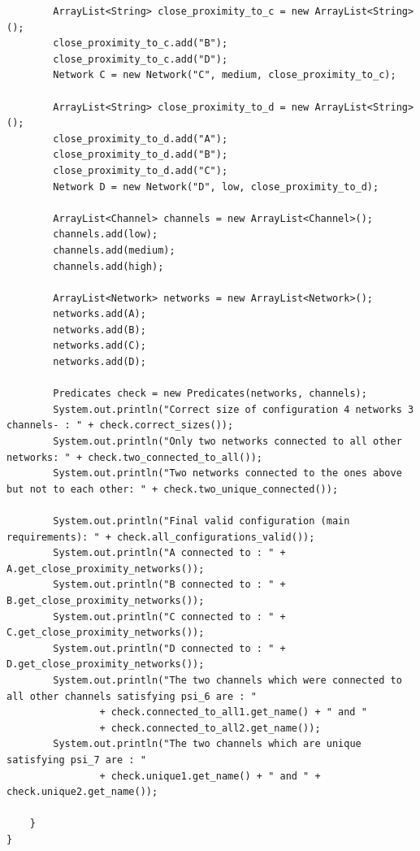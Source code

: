 \documentclass{article}
\begin{document}
\begin{enumerate}[(a)]
\begin{lstlisting}
        ArrayList<String> close_proximity_to_c = new ArrayList<String>();
        close_proximity_to_c.add("B");
        close_proximity_to_c.add("D");
        Network C = new Network("C", medium, close_proximity_to_c);

        ArrayList<String> close_proximity_to_d = new ArrayList<String>();
        close_proximity_to_d.add("A");
        close_proximity_to_d.add("B");
        close_proximity_to_d.add("C");
        Network D = new Network("D", low, close_proximity_to_d);

        ArrayList<Channel> channels = new ArrayList<Channel>();
        channels.add(low);
        channels.add(medium);
        channels.add(high);

        ArrayList<Network> networks = new ArrayList<Network>();
        networks.add(A);
        networks.add(B);
        networks.add(C);
        networks.add(D);

        Predicates check = new Predicates(networks, channels);
        System.out.println("Correct size of configuration 4 networks 3 channels- : " + check.correct_sizes());
        System.out.println("Only two networks connected to all other networks: " + check.two_connected_to_all());
        System.out.println("Two networks connected to the ones above but not to each other: " + check.two_unique_connected());
        
        System.out.println("Final valid configuration (main requirements): " + check.all_configurations_valid());
        System.out.println("A connected to : " + A.get_close_proximity_networks());
        System.out.println("B connected to : " + B.get_close_proximity_networks());
        System.out.println("C connected to : " + C.get_close_proximity_networks());
        System.out.println("D connected to : " + D.get_close_proximity_networks());
        System.out.println("The two channels which were connected to all other channels satisfying psi_6 are : "
                + check.connected_to_all1.get_name() + " and "
                + check.connected_to_all2.get_name());
        System.out.println("The two channels which are unique satisfying psi_7 are : " 
                + check.unique1.get_name() + " and " + check.unique2.get_name());
        
    }
}


\end{lstlisting}
\end{enumerate}
\end{document}
